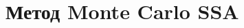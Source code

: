 \documentclass[specialist,
substylefile = spbu_report.rtx,
subf,href,colorlinks=true, 12pt]{disser}
\theoremstyle{definition}
\begin{document}

\chapter{Метод Monte Carlo SSA}
\end{document}
